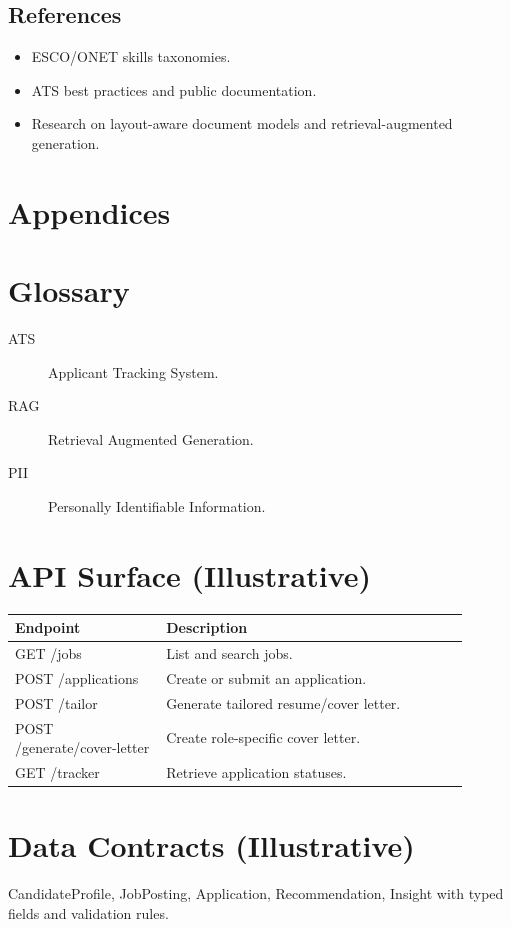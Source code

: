 \documentclass[12pt,a4paper]{article}
\begin{document}
\subsection*{References}
\begin{itemize}[leftmargin=2em]
  \item ESCO/ONET skills taxonomies.
  \item ATS best practices and public documentation.
  \item Research on layout-aware document models and retrieval-augmented generation.
\end{itemize}

\appendix
\section*{Appendices}

\section{Glossary}
\begin{description}
  \item[ATS] Applicant Tracking System.
  \item[RAG] Retrieval Augmented Generation.
  \item[PII] Personally Identifiable Information.
\end{description}

\section{API Surface (Illustrative)}
\begin{longtable}{p{0.3\linewidth} p{0.6\linewidth}}
\toprule
\textbf{Endpoint} & \textbf{Description}\\
\midrule
GET /jobs & List and search jobs.\\
POST /applications & Create or submit an application.\\
POST /tailor & Generate tailored resume/cover letter.\\
POST /generate/cover-letter & Create role-specific cover letter.\\
GET /tracker & Retrieve application statuses.\\
\bottomrule
\end{longtable}

\section{Data Contracts (Illustrative)}
CandidateProfile, JobPosting, Application, Recommendation, Insight with typed fields and validation rules.
\end{document}
